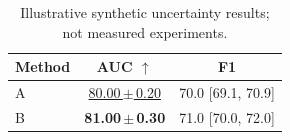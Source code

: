 \begin{table}[t]
\centering
\caption{Illustrative synthetic uncertainty results; not measured experiments.}
\label{tab:uncertainty}
\begin{tabular}{@{}lcc@{}}
\toprule
Method & AUC $\uparrow$ & F1 \\
\midrule
A & \underline{80.00\,$\pm$\,0.20} & 70.0 [69.1, 70.9] \\
B & \textbf{81.00\,$\pm$\,0.30} & 71.0 [70.0, 72.0] \\
\bottomrule
\end{tabular}
\end{table}
